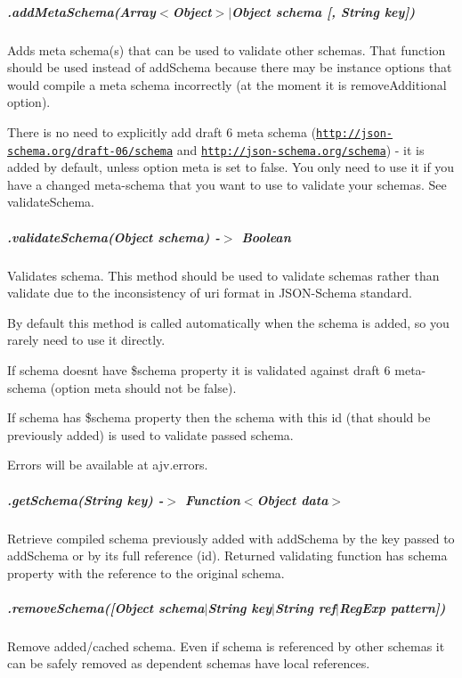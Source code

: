 \subparagraph*{.add\+Meta\+Schema(Array$<$Object$>$$\vert$\+Object schema \mbox{[}, String key\mbox{]})}

Adds meta schema(s) that can be used to validate other schemas. That function should be used instead of {\ttfamily add\+Schema} because there may be instance options that would compile a meta schema incorrectly (at the moment it is {\ttfamily remove\+Additional} option).

There is no need to explicitly add draft 6 meta schema (\href{http://json-schema.org/draft-06/schema}{\tt http\+://json-\/schema.\+org/draft-\/06/schema} and \href{http://json-schema.org/schema}{\tt http\+://json-\/schema.\+org/schema}) -\/ it is added by default, unless option {\ttfamily meta} is set to {\ttfamily false}. You only need to use it if you have a changed meta-\/schema that you want to use to validate your schemas. See {\ttfamily validate\+Schema}.

\subparagraph*{\label{_api-validateschema}%
.validate\+Schema(\+Object schema) -\/$>$ Boolean}

Validates schema. This method should be used to validate schemas rather than {\ttfamily validate} due to the inconsistency of {\ttfamily uri} format in J\+S\+O\+N-\/\+Schema standard.

By default this method is called automatically when the schema is added, so you rarely need to use it directly.

If schema doesn\textquotesingle{}t have {\ttfamily \$schema} property it is validated against draft 6 meta-\/schema (option {\ttfamily meta} should not be false).

If schema has {\ttfamily \$schema} property then the schema with this id (that should be previously added) is used to validate passed schema.

Errors will be available at {\ttfamily ajv.\+errors}.

\subparagraph*{.get\+Schema(\+String key) -\/$>$ Function$<$Object data$>$}

Retrieve compiled schema previously added with {\ttfamily add\+Schema} by the key passed to {\ttfamily add\+Schema} or by its full reference (id). Returned validating function has {\ttfamily schema} property with the reference to the original schema.

\subparagraph*{.remove\+Schema(\mbox{[}Object schema$\vert$\+String key$\vert$\+String ref$\vert$\+Reg\+Exp pattern\mbox{]})}

Remove added/cached schema. Even if schema is referenced by other schemas it can be safely removed as dependent schemas have local references.


